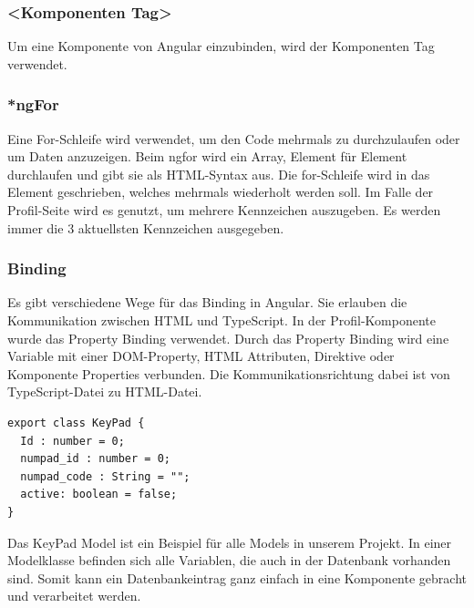 \subsubsection{<Komponenten Tag>}
Um eine Komponente von Angular einzubinden, wird der Komponenten Tag verwendet. 

\subsubsection{*ngFor}
Eine For-Schleife wird verwendet, um den Code mehrmals zu durchzulaufen oder um Daten anzuzeigen. Beim ngfor wird ein Array, Element für Element durchlaufen und gibt sie als HTML-Syntax aus. Die for-Schleife wird in das Element geschrieben, welches mehrmals wiederholt werden soll. Im Falle der Profil-Seite wird es genutzt, um mehrere Kennzeichen auszugeben. Es werden immer die 3 aktuellsten Kennzeichen ausgegeben.
\cite{NgFor}

\subsubsection{Binding}
Es gibt verschiedene Wege für das Binding in Angular. Sie erlauben die Kommunikation zwischen HTML und TypeScript. In der Profil-Komponente wurde das Property Binding verwendet. Durch das Property Binding wird eine Variable mit einer DOM-Property, HTML Attributen, Direktive oder Komponente Properties verbunden. Die Kommunikationsrichtung dabei ist von TypeScript-Datei zu HTML-Datei. 
\cite{Binding}
\pagebreak
\begin{lstlisting}[caption=KeyPad Model]
    export class KeyPad {
  Id : number = 0;
  numpad_id : number = 0;
  numpad_code : String = "";
  active: boolean = false;
}
\end{lstlisting}

Das KeyPad Model ist ein Beispiel für alle Models in unserem Projekt. In einer Modelklasse befinden sich alle Variablen, die auch in der Datenbank vorhanden sind. Somit kann ein Datenbankeintrag ganz einfach in eine Komponente gebracht und verarbeitet werden. 

